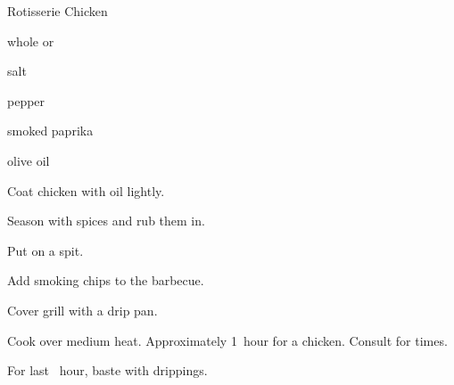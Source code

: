 \begin{recipe}{Rotisserie Chicken}{}{}

\begin{ingredients}
\item whole  or 
\item salt
\item pepper
\item smoked paprika
\item olive oil
\end{ingredients}

\begin{directions}
\item Coat chicken with oil lightly.
\item Season with spices and rub them in.
\item Put on a spit.
\item Add smoking chips to the barbecue.
\item Cover grill with a drip pan.
\item Cook over medium heat. Approximately 1~hour for a chicken. Consult  for times.
\item For last \half~hour, baste with drippings.
\end{directions}

\end{recipe}
